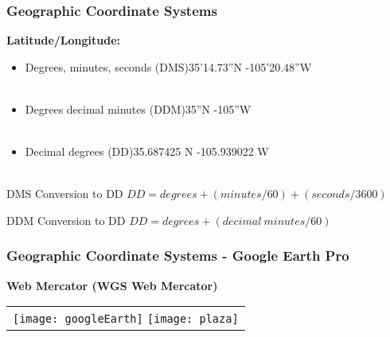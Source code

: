 \documentclass[t]{beamer} %
\begin{document}
\begin{frame}
\frametitle{Geographic Coordinate Systems}

\textbf{Latitude/Longitude:}
\begin{itemize}
\item Degrees, minutes, seconds (DMS)\hfill    35'14.73''N  -105'20.48''W \\~\\
\item Degrees decimal minutes (DDM)\hfill   35''N  -105''W \\~\\
\item Decimal degrees (DD)\hfill 35.687425 N -105.939022 W \\~\\
\end{itemize}

\begin{block}{DMS Conversion to DD}
$DD = degrees + (minutes/60) + (seconds/3600)$
\end{block}

\begin{block}{DDM Conversion to DD}
$DD = degrees + (decimal\ minutes/60)$
\end{block}
\end{frame}


\begin{frame}
\frametitle{Geographic Coordinate Systems - Google Earth Pro}
\textbf{Web Mercator  (WGS Web Mercator)}
\vspace{-0.3in}
\begin{table}
\begin{tabular}{l}
\texttt{[image: googleEarth]} 
\texttt{[image: plaza]} \\
\end{tabular}
\end{table}
\end{frame}

\end{document}
